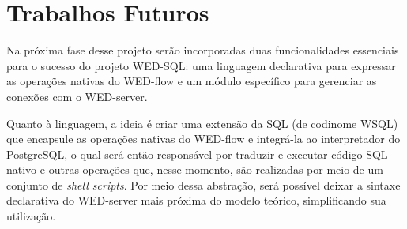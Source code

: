 \documentclass[conference]{IEEEtran}
\begin{document}
%



\section{Trabalhos Futuros}

Na próxima fase desse projeto serão incorporadas duas funcionalidades essenciais para o sucesso do projeto WED-SQL: uma
linguagem declarativa para expressar as operações nativas do WED-flow e um módulo específico para gerenciar as conexões
com o WED-server.

\par Quanto à linguagem, a ideia é criar uma extensão da SQL (de codinome WSQL) que encapsule as operações nativas do WED-flow e integrá-la
ao interpretador do PostgreSQL, o qual será então responsável por traduzir e executar código SQL nativo e outras operações que,
nesse momento, são realizadas por meio de um conjunto de \emph{shell scripts}. Por meio dessa abstração, será possível 
deixar a sintaxe declarativa do WED-server mais próxima do modelo teórico, simplificando sua utilização.
\end{document}
